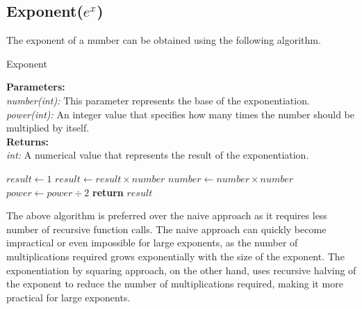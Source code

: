 \subsection{Exponent($e^x$)}
  \begin{flushleft}
    The exponent of a number can be obtained using the following algorithm.
  \end{flushleft}

  \begin{algorithm}
    \caption{Exponent}\label{exp}
      \begin{tabbing}
        \textbf{Parameters:}\\
          \hspace{1em}\textit{number(int):} This parameter represents the base of the exponentiation.\\
          \hspace{1em}\textit{power(int):} An integer value that specifies how many times the number should be multiplied by itself.\\
          
        \textbf{Returns:}\\
          \hspace{1em}\textit{int:}  A numerical value that represents the result of the exponentiation.
      \end{tabbing}
      \vspace{1 em}
    \begin{algorithmic}
          \State $result \gets 1$
                  \State $result \gets result \times number$
              \EndIf
              \State $number \gets number \times number$
              \State $power \gets power \div 2$ 
          \EndWhile
          \State \textbf{return} $result$
      \EndFunction
      \end{algorithmic}
  \end{algorithm}
  \begin{flushleft}
    The above algorithm is preferred over the naive approach as it requires less number of recursive function calls.
    The naive approach can quickly become impractical or even impossible for large exponents, as the number of multiplications required grows exponentially with the size of the exponent. The exponentiation by squaring approach, on the other hand, uses recursive halving of the exponent to reduce the number of multiplications required, making it more practical for large exponents.
  \end{flushleft}
\pagebreak